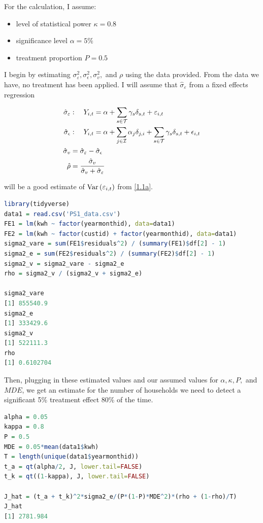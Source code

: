 \documentclass[12pt]{article}
\begin{document}
For the calculation, I assume:
\begin{itemize}
    \item level of statistical power $\kappa = 0.8$
    \item significance level $\alpha = 5\%$
    \item treatment proportion $P = 0.5$
\end{itemize}

I begin by estimating $\sigma_\varepsilon^2, \sigma_\epsilon^2, \sigma_v^2,$ and $\rho$ using the data provided. From the data we have, no treatment has been applied.  I will assume that $\hat\sigma_\varepsilon$ from a fixed effects regression

\begin{align*}
\hat\sigma_\varepsilon &:\quad
    Y_{i,t} = \alpha 
    + \sum\limits_{s\in\mathcal{T}}\gamma_s\delta_{s,t}
    + \varepsilon_{i,t}\\
\hat\sigma_\epsilon &:\quad
    Y_{i,t} = \alpha 
    + \sum\limits_{j\in\mathcal{I}}\alpha_j\delta_{j,i}
    + \sum\limits_{s\in\mathcal{T}}\gamma_s\delta_{s,t}
    + \epsilon_{i,t}\\
\hat\sigma_v &= \hat\sigma_\varepsilon - \hat\sigma_\epsilon \\
\hat\rho &= \frac{\hat\sigma_v}{\hat\sigma_v + \hat\sigma_\varepsilon}
\end{align*}

will be a good estimate of $\text{Var}\left(\varepsilon_{i,t}\right)$ from \eqref{1.1a}.


\begin{lstlisting}[language=R]
library(tidyverse)
data1 = read.csv('PS1_data.csv')
FE1 = lm(kwh ~ factor(yearmonthid), data=data1)
FE2 = lm(kwh ~ factor(custid) + factor(yearmonthid), data=data1)
sigma2_vare = sum(FE1$residuals^2) / (summary(FE1)$df[2] - 1)
sigma2_e = sum(FE2$residuals^2) / (summary(FE2)$df[2] - 1)
sigma2_v = sigma2_vare - sigma2_e
rho = sigma2_v / (sigma2_v + sigma2_e)

sigma2_vare
[1] 855540.9
sigma2_e
[1] 333429.6
sigma2_v
[1] 522111.3
rho
[1] 0.6102704
\end{lstlisting}

Then, plugging in these estimated values and our assumed values for $\alpha, \kappa, P,$ and $MDE$, we get an estimate for the number of households we need to detect a significant 5\% treatment effect 80\% of the time.


\begin{lstlisting}[language=R]
alpha = 0.05
kappa = 0.8
P = 0.5
MDE = 0.05*mean(data1$kwh)
T = length(unique(data1$yearmonthid))
t_a = qt(alpha/2, J, lower.tail=FALSE)
t_k = qt((1-kappa), J, lower.tail=FALSE)

J_hat = (t_a + t_k)^2*sigma2_e/(P*(1-P)*MDE^2)*(rho + (1-rho)/T)
J_hat
[1] 2781.984
\end{lstlisting}
\end{document}
